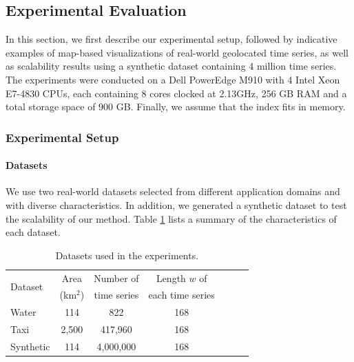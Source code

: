 \subsection{Experimental Evaluation}
\label{sec:evaluation}

In this section, we first describe our experimental setup, followed by indicative examples of map-based visualizations of real-world geolocated time series, as well as scalability results using a synthetic dataset containing 4 million time series. The experiments were conducted on a Dell PowerEdge M910 with 4 Intel Xeon E7-4830 CPUs, each containing 8 cores clocked at 2.13GHz, 256 GB RAM and a total storage space of 900 GB. Finally, we assume that the index fits in memory.

\subsubsection{Experimental Setup}
\label{subsec:exp_setup}

\paragraph{Datasets}

We use two real-world datasets selected from different application domains and with diverse characteristics. In addition, we generated a synthetic dataset to test the scalability of our method. Table \ref{tab:datasets} lists a summary of the characteristics of each dataset.

\begin{table}[!h]
	\centering
	\caption{Datasets used in the experiments.}
	\vspace{-10pt}
	\begin{small}
	\centering
	\begin{tabular}{lcccccc}
	\hline
	\multirow{2}{*}{Dataset} & Area & Number of & Length $w$ of \\
	 & (km$^2$) & time series & each time series \\
	\hline
	Water & 114 & 822 & 168 \\
	Taxi & 2,500 & 417,960 & 168 \\
	Synthetic & 114 & 4,000,000 & 168 \\
	\hline
	\end{tabular}
	\end{small}
	\label{tab:datasets}
\end{table}

